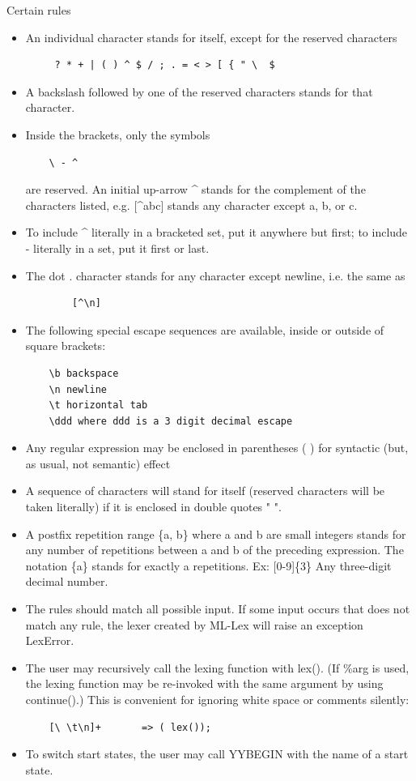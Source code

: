 \documentclass[8pt, a4paper, oneside, twocolumn]{extarticle}
\begin{document}
Certain rules
\begin{itemize}
    \item     An individual character stands for itself, except for the reserved characters 
    \begin{verbatim}
     ? * + | ( ) ^ $ / ; . = < > [ { " \  $

    \end{verbatim}

    \item A backslash followed by one of the reserved characters stands for that character. 

    \item Inside the brackets, only the symbols \begin{verbatim} 
    \ - ^ 
\end{verbatim}
 are reserved. An initial up-arrow \^{} stands for the complement of the characters listed, e.g. [\^{}abc] stands any character except a, b, or c.
    \item  To include \^{} literally in a bracketed set, put it anywhere but first; to include - literally in a set, put it first or last. 
    \item The dot . character stands for any character except newline, i.e. the same as \begin{verbatim}
        [^\n]
    \end{verbatim}
    \item The following special escape sequences are available, inside or outside of square brackets: 
    \begin{verbatim}
    \b backspace
    \n newline
    \t horizontal tab
    \ddd where ddd is a 3 digit decimal escape
    \end{verbatim}
    \item Any regular expression may be enclosed in parentheses ( ) for syntactic (but, as
    usual, not semantic) effect
    \item A sequence of characters will stand for itself (reserved characters will be taken literally) if it is enclosed in double quotes " ".
    \item A postfix repetition range \{a, b\} where a and b are small integers stands for any number of repetitions between a and b of the preceding expression. The notation \{a\} stands for exactly a repetitions. Ex: [0-9]\{3\}
    Any three-digit decimal number. 
    \item The rules should match all possible input. If some input occurs that does not match any rule, the lexer created by ML-Lex will raise an exception LexError.
    \item  The user may recursively call the lexing function with lex(). (If \%arg is used, the lexing function may be re-invoked with the same argument by using continue().) This is convenient for ignoring white space or comments silently:
    \begin{verbatim}
    [\ \t\n]+       => ( lex());
    \end{verbatim}
    \item To switch start states, the user may call YYBEGIN with the name of a start state. 
\end{itemize}
\end{document}
